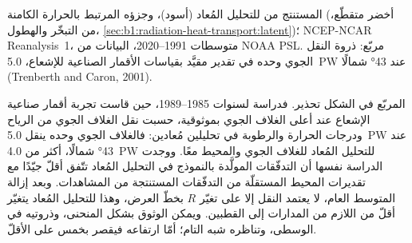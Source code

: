 \begin{omfigure}

{\small {} المستنتج من  للتحليل المُعاد (أسود)، وجزؤه المرتبط بالحرارة الكامنة (أخضر متقطّع، من التبخّر والهطول، \cref{sec:b1:radiation-heat-transport:latent})؛ NCEP-NCAR
Reanalysis~1، متوسطات 1991--2020، البيانات من NOAA PSL. مربّع: ذروة النقل الجوي وحده في تقدير مقيَّد بقياسات الأقمار الصناعية للإشعاع، \qty{5.0}{PW} عند \ang{43} شمالًا (Trenberth and Caron,
2001).}
\label{fig:b1:radiation-heat-transport:transport}
\end{omfigure}

المربّع في الشكل تحذير. فدراسة لسنوات 1985--1989، حين قاست تجربة أقمار صناعية الإشعاع عند أعلى الغلاف الجوي بموثوقية، حسبت نقل الغلاف الجوي من الرياح ودرجات الحرارة والرطوبة في تحليلين مُعادين: فالغلاف الجوي وحده ينقل \qty{5.0}{PW} عند \ang{43} شمالًا، أكثر من \qty{4.0}{PW} للتحليل المُعاد للغلاف الجوي والمحيط معًا. ووجدت الدراسة نفسها أن التدفّقات المولَّدة بالنموذج في التحليل المُعاد تتّفق أقلّ جيّدًا مع تقديرات المحيط المستقلّة من التدفّقات المستنتجة من المشاهدات. وبعد إزالة المتوسط العام، لا يعتمد النقل إلا على تغيّر $R$ بخطّ العرض، وهذا  للتحليل المُعاد يتغيّر أقلّ من اللازم من المدارات إلى القطبين. ويمكن الوثوق بشكل المنحنى، وذروتيه في  الوسطى، وتناظره شبه التام؛ أمّا ارتفاعه فيقصر بخمس على الأقلّ.

